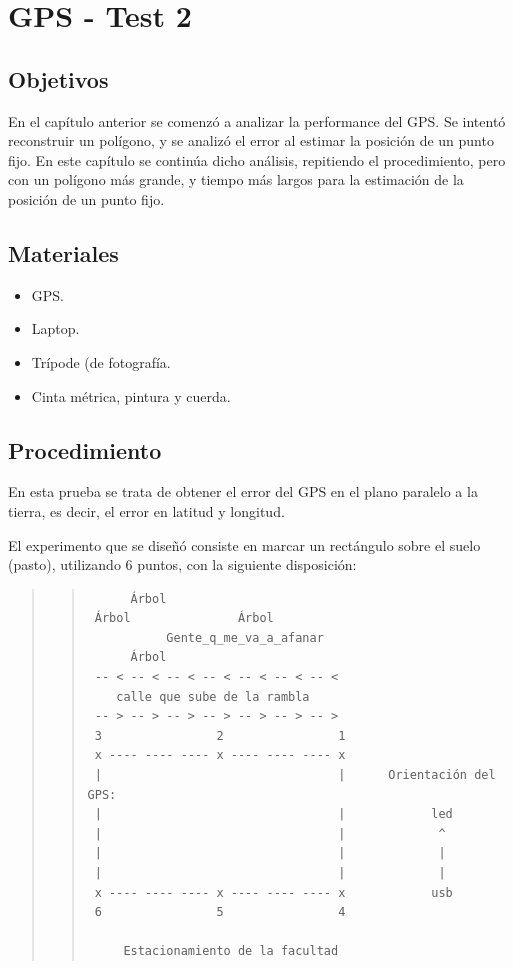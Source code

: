 \documentclass[spanish,12pt,a4paper,titlepage]{report}
\begin{document}
\chapter{GPS - Test 2}
\label{chap-gps-test-2}

\section{Objetivos}
\label{chap-gps-test-1}

En el capítulo anterior se comenzó a analizar la performance del GPS. Se intentó reconstruir un polígono, y se analizó el error al estimar la posición de un punto fijo. En este capítulo se continúa dicho análisis, repitiendo el procedimiento, pero con un polígono más grande, y tiempo más largos para la estimación de la posición de un punto fijo.

\section{Materiales}

\begin{itemize}
\item GPS.
\item Laptop.
\item Trípode (de fotografía.
\item Cinta métrica, pintura y cuerda.
\end{itemize}

\newpage
\section{Procedimiento}
\label{sec:gps2-procedimiento}

En esta prueba se trata de obtener el error del GPS en el plano paralelo a la tierra, es decir, el error en latitud y longitud.

El experimento que se diseñó consiste en marcar un rectángulo sobre el suelo (pasto), utilizando 6 puntos, con la siguiente disposición:

\begin{quote}
\begin{quote}
\begin{verbatim}
      Árbol              
 Árbol               Árbol
           Gente_q_me_va_a_afanar
      Árbol
 -- < -- < -- < -- < -- < -- < -- <
    calle que sube de la rambla
 -- > -- > -- > -- > -- > -- > -- > 
 3                2                1
 x ---- ---- ---- x ---- ---- ---- x
 |                                 |      Orientación del GPS:
 |                                 |            led
 |                                 |             ^
 |                                 |             |
 |                                 |             |
 x ---- ---- ---- x ---- ---- ---- x            usb
 6                5                4

     Estacionamiento de la facultad
\end{verbatim}
\end{quote}
\end{quote}
\end{document}
